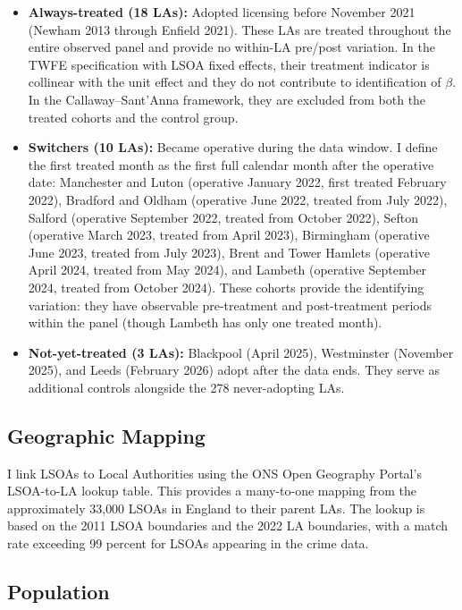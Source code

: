 \documentclass[12pt]{article}
\begin{document}
\begin{itemize}
\item \textbf{Always-treated (18 LAs):} Adopted licensing before November 2021 (Newham 2013 through Enfield 2021). These LAs are treated throughout the entire observed panel and provide no within-LA pre/post variation. In the TWFE specification with LSOA fixed effects, their treatment indicator is collinear with the unit effect and they do not contribute to identification of $\beta$. In the Callaway--Sant'Anna framework, they are excluded from both the treated cohorts and the control group.
\item \textbf{Switchers (10 LAs):} Became operative during the data window. I define the first treated month as the first full calendar month after the operative date: Manchester and Luton (operative January 2022, first treated February 2022), Bradford and Oldham (operative June 2022, treated from July 2022), Salford (operative September 2022, treated from October 2022), Sefton (operative March 2023, treated from April 2023), Birmingham (operative June 2023, treated from July 2023), Brent and Tower Hamlets (operative April 2024, treated from May 2024), and Lambeth (operative September 2024, treated from October 2024). These cohorts provide the identifying variation: they have observable pre-treatment and post-treatment periods within the panel (though Lambeth has only one treated month).
\item \textbf{Not-yet-treated (3 LAs):} Blackpool (April 2025), Westminster (November 2025), and Leeds (February 2026) adopt after the data ends. They serve as additional controls alongside the 278 never-adopting LAs.
\end{itemize}

\subsection{Geographic Mapping}

I link LSOAs to Local Authorities using the ONS Open Geography Portal's LSOA-to-LA lookup table. This provides a many-to-one mapping from the approximately 33{,}000 LSOAs in England to their parent LAs. The lookup is based on the 2011 LSOA boundaries and the 2022 LA boundaries, with a match rate exceeding 99 percent for LSOAs appearing in the crime data.

\subsection{Population}
\end{document}

